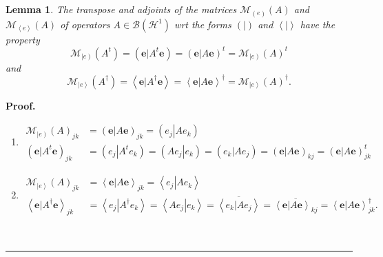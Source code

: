 \documentclass[aps,preprint]{revtex4}%
\newtheorem{lemma}[theorem]{Lemma}
\newenvironment{proof}[1][Proof]{\noindent\textbf{#1.} }{\ \rule{0.5em}{0.5em}}
\begin{document}
\begin{lemma}
The transpose and adjoints of the matrices $\mathcal{M}_{\left(  e\right)
}\left(  A\right)  $ and $\mathcal{M}_{\left\langle e\right\rangle }\left(
A\right)  $ of operators $A\in\mathcal{B}\left(  \mathcal{H}^{1}\right)  $ wrt
the forms $\left(  \left.  {}\right\vert \right)  $ and $\left\langle \left.
{}\right\vert \right\rangle $ have the property
\begin{equation}
\mathcal{M}_{\left\vert e\right)  }\left(  A^{t}\right)  =\left(  \left.
\mathbf{e}\right\vert A^{t}\mathbf{e}\right)  =\left(  \left.  \mathbf{e}%
\right\vert A\mathbf{e}\right)  ^{t}=\mathcal{M}_{\left\vert e\right)
}\left(  A\right)  ^{t}%
\end{equation}
and
\begin{equation}
\mathcal{M}_{\left\vert e\right\rangle }\left(  A^{\dagger}\right)
=\left\langle \left.  \mathbf{e}\right\vert A^{\dagger}\mathbf{e}\right\rangle
=\left\langle \left.  \mathbf{e}\right\vert A\mathbf{e}\right\rangle
^{\dagger}=\mathcal{M}_{\left\vert e\right\rangle }\left(  A\right)
^{\dagger}.
\end{equation}

\end{lemma}

\begin{proof}
\begin{enumerate}
\item
\begin{align}
\mathcal{M}_{\left\vert e\right)  }\left(  A\right)  _{jk}  &  =\left(
\left.  \mathbf{e}\right\vert A\mathbf{e}\right)  _{jk}=\left(  \left.
e_{j}\right\vert Ae_{k}\right) \\
\left(  \left.  \mathbf{e}\right\vert A^{t}\mathbf{e}\right)  _{jk}  &
=\left(  \left.  e_{j}\right\vert A^{t}e_{k}\right)  =\left(  \left.
Ae_{j}\right\vert e_{k}\right)  =\left(  \left.  e_{k}\right\vert
Ae_{j}\right)  =\left(  \left.  \mathbf{e}\right\vert A\mathbf{e}\right)
_{kj}=\left(  \left.  \mathbf{e}\right\vert A\mathbf{e}\right)  _{jk}^{t}%
\end{align}


\item
\begin{align}
\mathcal{M}_{\left\vert e\right\rangle }\left(  A\right)  _{jk}  &
=\left\langle \left.  \mathbf{e}\right\vert A\mathbf{e}\right\rangle
_{jk}=\left\langle \left.  e_{j}\right\vert Ae_{k}\right\rangle \\
\left\langle \left.  \mathbf{e}\right\vert A^{\dagger}\mathbf{e}\right\rangle
_{jk}  &  =\left\langle \left.  e_{j}\right\vert A^{\dagger}e_{k}\right\rangle
=\left\langle \left.  Ae_{j}\right\vert e_{k}\right\rangle =\overline
{\left\langle \left.  e_{k}\right\vert Ae_{j}\right\rangle }=\overline
{\left\langle \left.  \mathbf{e}\right\vert A\mathbf{e}\right\rangle _{kj}%
}=\left\langle \left.  \mathbf{e}\right\vert A\mathbf{e}\right\rangle
_{jk}^{\dagger}.
\end{align}

\end{enumerate}
\end{proof}
\end{document}

